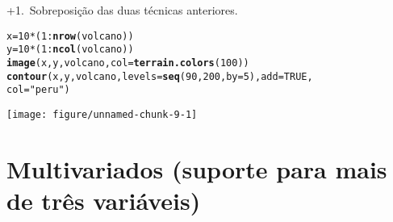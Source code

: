 \documentclass{article}\usepackage[]{graphicx}\usepackage[]{color}
\makeatletter
\def\maxwidth{ %
  \ifdim\Gin@nat@width>\linewidth
    \linewidth
  \else
    \Gin@nat@width
  \fi
}
\newcommand{\hlnum}[1]{\textcolor[rgb]{0.686,0.059,0.569}{#1}}%
\newcommand{\hlstr}[1]{\textcolor[rgb]{0.192,0.494,0.8}{#1}}%
\newcommand{\hlopt}[1]{\textcolor[rgb]{0,0,0}{#1}}%
\newcommand{\hlstd}[1]{\textcolor[rgb]{0.345,0.345,0.345}{#1}}%
\newcommand{\hlkwb}[1]{\textcolor[rgb]{0.69,0.353,0.396}{#1}}%
\newcommand{\hlkwc}[1]{\textcolor[rgb]{0.333,0.667,0.333}{#1}}%
\newcommand{\hlkwd}[1]{\textcolor[rgb]{0.737,0.353,0.396}{\textbf{#1}}}%
\newenvironment{kframe}{%
 \def\at@end@of@kframe{}%
 \ifinner\ifhmode%
  \def\at@end@of@kframe{\end{minipage}}%
  \begin{minipage}{\columnwidth}%
 \fi\fi%
 \def\FrameCommand##1{\hskip\@totalleftmargin \hskip-\fboxsep
 \colorbox{shadecolor}{##1}\hskip-\fboxsep
     \hskip-\linewidth \hskip-\@totalleftmargin \hskip\columnwidth}%
 \MakeFramed {\advance\hsize-\width
   \@totalleftmargin\z@ \linewidth\hsize
   \@setminipage}}%
 {\par\unskip\endMakeFramed%
 \at@end@of@kframe}
\newenvironment{knitrout}{}{} %
\newcounter{graph}[section]
\renewcommand{\thegraph}{\number\numexpr\value{graph}+1\relax.~\stepcounter{graph}}
\makeatother
\begin{document}
\pagebreak
\thegraph Sobreposição das duas técnicas anteriores.
\begin{knitrout}
\color{fgcolor}\begin{kframe}
\begin{alltt}
\hlstd{x} \hlkwb{=} \hlnum{10} \hlopt{*} \hlstd{(}\hlnum{1}\hlopt{:}\hlkwd{nrow}\hlstd{(volcano))}
\hlstd{y} \hlkwb{=} \hlnum{10} \hlopt{*} \hlstd{(}\hlnum{1}\hlopt{:}\hlkwd{ncol}\hlstd{(volcano))}
\hlkwd{image}\hlstd{(x, y, volcano,} \hlkwc{col} \hlstd{=} \hlkwd{terrain.colors}\hlstd{(}\hlnum{100}\hlstd{))}
\hlkwd{contour}\hlstd{(x, y, volcano,} \hlkwc{levels} \hlstd{=} \hlkwd{seq}\hlstd{(}\hlnum{90}\hlstd{,} \hlnum{200}\hlstd{,} \hlkwc{by} \hlstd{=} \hlnum{5}\hlstd{),} \hlkwc{add} \hlstd{=} \hlnum{TRUE}\hlstd{,}
        \hlkwc{col} \hlstd{=} \hlstr{"peru"}\hlstd{)}
\end{alltt}
\end{kframe}
\texttt{[image: figure/unnamed-chunk-9-1]} 

\end{knitrout}
\pagebreak
\section{Multivariados (suporte para mais de três variáveis)}
\end{document}
